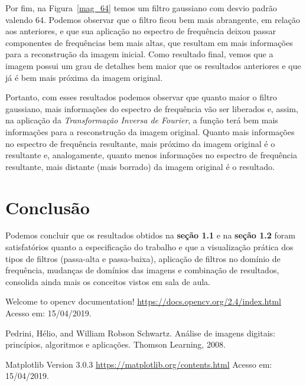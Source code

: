 \documentclass[twoside,twocolumn]{article}
\begin{document}
Por fim, na Figura~\ref{mag_64} temos um filtro gaussiano com desvio padrão valendo 64. Podemos observar que o filtro ficou bem mais abrangente, em relação aos anteriores, e que sua aplicação no espectro de frequência deixou passar componentes de frequências bem mais altas, que resultam em mais informações para a reconstrução da imagem inicial. Como resultado final, vemos que a imagem possui um grau de detalhes bem maior que os resultados anteriores e que já é bem mais próxima da imagem original.

Portanto, com esses resultados podemos observar que quanto maior o filtro gaussiano, mais informações do espectro de frequência vão ser liberados e, assim, na aplicação da \textit{Transformação Inversa de Fourier}, a função terá bem mais informações para a resconstrução da imagem original. Quanto mais informações no espectro de frequência resultante, mais próximo da imagem original é o resultante e, analogamente, quanto menos informações no espectro de frequência resultante, mais distante (mais borrado) da imagem original é o resultado.


\section{Conclusão}

Podemos concluir que os resultados obtidos na \textbf{seção 1.1} e na \textbf{seção 1.2} foram satisfatórios quanto a especificação do trabalho e que a visualização prática dos tipos de filtros (passa-alta e passa-baixa), aplicação de filtros no domínio de frequência, mudanças de domínios das imagens e combinação de resultados, consolida ainda mais os conceitos vistos em sala de aula.


\begin{thebibliography}{99} %

 Welcome to opencv documentation! \href{https://docs.opencv.org/2.4/index.html}{https://docs.opencv.org/2.4/index.html} Acesso em: 15/04/2019.

 Pedrini, Hélio, and William Robson Schwartz. Análise de imagens digitais: princípios, algoritmos e aplicações. Thomson Learning, 2008.

 Matplotlib Version 3.0.3 \href{https://matplotlib.org/contents.html}{https://matplotlib.org/contents.html} Acesso em: 15/04/2019.
 
\end{thebibliography}
\end{document}
